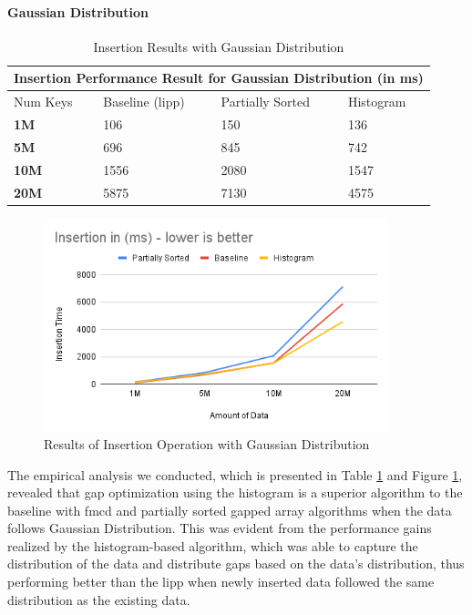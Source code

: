 \documentclass[11pt,a4paper]{article}
\begin{document}
\paragraph{Gaussian Distribution} 
\begin{table}
    \centering
    \begin{tabular}{ |p{2cm}|p{2cm}|p{2cm}|p{2cm}| } 
        
     \hline
     \multicolumn{4}{|c|}{Insertion Performance Result for Gaussian Distribution (in ms)} \\
     \hline
      Num Keys & Baseline (\acrshort{lipp})  & Partially Sorted & Histogram \\
     \hline
     \textbf{1M} & 106 & 150 & 136 \\
     \textbf{5M} & 696 & 845 & 742 \\
     \textbf{10M} & 1556 & 2080 & 1547 \\
     \textbf{20M} & 5875 & 7130 & 4575 \\
     \hline
    
    \end{tabular}
     \caption{Insertion Results with Gaussian Distribution}
    \label{tab:InsertionResult}
\end{table}
\begin{figure}
    \centering
    \includegraphics[width=100mm,scale=1]{Figures/InsertionResult.png}
    \caption{
     Results of Insertion Operation with Gaussian Distribution 
    }
    \label{fig:GraphInsertionResult}
\end{figure}

The empirical analysis we conducted, which is presented in Table \ref{tab:InsertionResult} and Figure \ref{fig:GraphInsertionResult}, revealed that gap optimization using the histogram is a superior algorithm to the baseline with \acrshort{fmcd} \cite{LIPP} and partially sorted gapped array algorithms when the data follows Gaussian Distribution. This was evident from the performance gains realized by the histogram-based algorithm, which was able to capture the distribution of the data and distribute gaps based on the data's distribution, thus performing better than the \acrshort{lipp} when newly inserted data followed the same distribution as the existing data.
\end{document}
